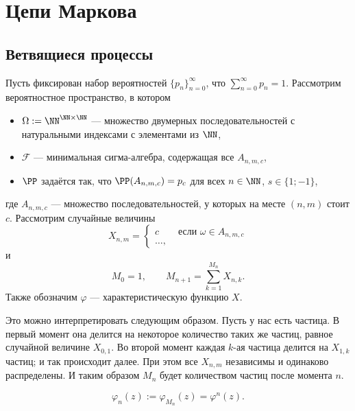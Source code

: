 \documentclass[12pt,a4paper]{article}
\begin{document}
    \section{Цепи Маркова}

    \subsection{Ветвящиеся процессы}

    \begin{definition}
        Пусть фиксирован набор вероятностей $\{p_n\}_{n=0}^\infty$, что $\sum_{n=0}^\infty p_n = 1$. Рассмотрим вероятностное пространство, в котором
        \begin{itemize}
            \item $\Omega := \NN^{\NN \times \NN}$ --- множество двумерных последовательностей с натуральными индексами с элементами из $\NN$,
            \item $\mathcal{F}$ --- минимальная сигма-алгебра, содержащая все $A_{n, m, c}$,
            \item $\PP$ задаётся так, что $\PP(A_{n, m, c}) = p_c$ для всех $n \in \NN$, $s \in \{1; -1\}$,
        \end{itemize}
        где $A_{n, m, c}$ --- множество последовательностей, у которых на месте $(n, m)$ стоит $c$. Рассмотрим случайные величины
        \[
            X_{n, m} =
            \begin{cases}
                c& \text{ если } \omega \in A_{n, m, c}\\
                \dots,
            \end{cases}
        \]
        и
        \[M_0 = 1, \qquad M_{n+1} = \sum_{k=1}^{M_n} X_{n, k}.\]
        Также обозначим $\varphi$ --- характеристическую функцию $X$.

        Это можно интерпретировать следующим образом. Пусть у нас есть частица. В первый момент она делится на некоторое количество таких же частиц, равное случайной величине $X_{0, 1}$. Во второй момент каждая $k$-ая частица делится на $X_{1, k}$ частиц; и так происходит далее. При этом все $X_{n, m}$ независимы и одинаково распределены. И таким образом $M_n$ будет количеством частиц после момента $n$.
    \end{definition}

    \begin{lemma}
        \[\varphi_n(z) := \varphi_{M_n}(z) = \varphi^n(z).\]
    \end{lemma}
\end{document}
